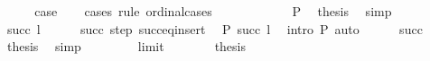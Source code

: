 \begin{isabellebody}
\ \ \isamarkupfalse%
\ \isamarkupfalse%
\ {\isacharquery}{\kern0pt}case\isanewline
\ \ \isamarkupfalse%
\ {\isacharparenleft}{\kern0pt}cases\ rule{\isacharcolon}{\kern0pt}\ ordinal{\isacharunderscore}{\kern0pt}cases{\isacharparenright}{\kern0pt}\isanewline
\ \ \ \ \isamarkupfalse%
\ {}\isanewline
\ \ \ \ \isamarkupfalse%
\ P{\isacharparenleft}{\kern0pt}{}{\isacharparenright}{\kern0pt}\ \isamarkupfalse%
\ {\isacharquery}{\kern0pt}thesis\ \isamarkupfalse%
\ simp\isanewline
\ \ \isamarkupfalse%
\isanewline
\ \ \ \ \isamarkupfalse%
\ {\isacharparenleft}{\kern0pt}succ\ l{\isacharparenright}{\kern0pt}\isanewline
\ \ \ \ \isamarkupfalse%
\ succ\ step\ succ{\isacharunderscore}{\kern0pt}eq{\isacharunderscore}{\kern0pt}insert\ \isamarkupfalse%
\ {\isachardoublequoteopen}P\ {\isacharparenleft}{\kern0pt}succ\ l{\isacharparenright}{\kern0pt}{\isachardoublequoteclose}\ \isamarkupfalse%
\ {\isacharparenleft}{\kern0pt}intro\ P{\isacharparenleft}{\kern0pt}{}{\isacharparenright}{\kern0pt}{\isacharparenright}{\kern0pt}\ auto\isanewline
\ \ \ \ \isamarkupfalse%
\ succ\ \isamarkupfalse%
\ {\isacharquery}{\kern0pt}thesis\ \isamarkupfalse%
\ simp\isanewline
\ \ \isamarkupfalse%
\isanewline
\ \ \ \ \isamarkupfalse%
\ limit\isanewline
\ \ \ \ \isamarkupfalse%
\ \isamarkupfalse%
\ {\isacharquery}{\kern0pt}thesis\ \isamarkupfalse%
\isanewline
\ \ \isamarkupfalse%
\isanewline
{}\isamarkupfalse%
%
\endisatagproof
{\isafoldproof}%
%
\isadelimproof
\isanewline
%
\endisadelimproof
\isanewline
{}\isamarkupfalse%
\isanewline
%
\isadelimtheory
\isanewline
%
\endisadelimtheory
%
\isatagtheory
{}\isamarkupfalse%
%
\endisatagtheory
{\isafoldtheory}%
%
\isadelimtheory
%
\endisadelimtheory
%
\end{isabellebody}%
\endinput
